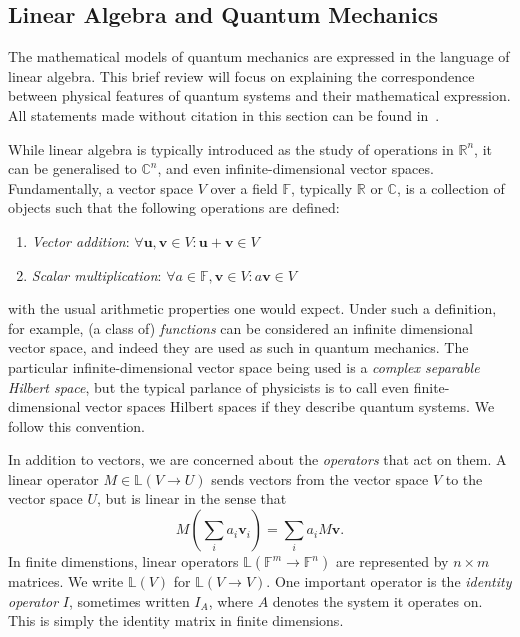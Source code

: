 \documentclass[10pt, a4paper]{article}
\numberwithin{equation}{section} %
\theoremstyle{definition}
\theoremstyle{plain}
\newcommand{\?}{\mathrel{?}} %
\newcommand{\R}{\mathbb{R}} %
\newcommand{\C}{\mathbb{C}} %
\newcommand{\Lin}[1]{\mathbb{L}\left(#1\right)}
\newcommand{\cvec}[1]{\boldsymbol{\mathbf{#1}}}    %
\begin{document}
\begin{appendices}
                    \subsection{Linear Algebra and Quantum Mechanics}\label{sec:prelim_linalg}

                    The mathematical models of quantum mechanics are expressed in the language of linear algebra. This brief review will focus on explaining the correspondence between physical features of quantum systems and their mathematical expression. All statements made without citation in this section can be found in~\cite{NielsenChuang}.

                    While linear algebra is typically introduced as the study of operations in \(\R^n\), it can be generalised to \(\C^n\), and even infinite-dimensional vector spaces. Fundamentally, a vector space \(V\) over a field \(\mathbb{F}\), typically \(\R\) or \(\C\), is a collection of objects such that the following operations are defined:
                    \begin{enumerate}
                      \item \emph{Vector addition}: \(\forall \cvec{u}, \cvec{v} \in V : \cvec{u} + \cvec{v} \in V\)
                      \item \emph{Scalar multiplication}: \(\forall a \in \mathbb{F}, \cvec{v} \in V : a\cvec{v} \in V\)
                    \end{enumerate}
                    with the usual arithmetic properties one would expect. Under such a definition, for example, (a class of) \emph{functions} can be considered an infinite dimensional vector space, and indeed they are used as such in quantum mechanics. The particular infinite-dimensional vector space being used is a \emph{complex separable Hilbert space}, but the typical parlance of physicists is to call even finite-dimensional vector spaces Hilbert spaces if they describe quantum systems. We follow this convention.

                    In addition to vectors, we are concerned about the \emph{operators} that act on them. A linear operator \(M \in \Lin{V \to U}\) sends vectors from the vector space \(V\) to the vector space \(U\), but is linear in the sense that
                    \begin{equation}
                      M\left(\sum_i a_i\cvec{v}_i\right) = \sum_i a_i M\cvec{v}.
                    \end{equation}
                    In finite dimenstions, linear operators \(\Lin{\mathbb{F}^m \to \mathbb{F}^n}\) are represented by \(n \times m\) matrices. We write \(\Lin{V}\) for \(\Lin{V \to V}\). One important operator is the \emph{identity operator} \(I\), sometimes written \(I_A\), where \(A\) denotes the system it operates on. This is simply the identity matrix in finite dimensions.


\end{appendices}
\end{document}
